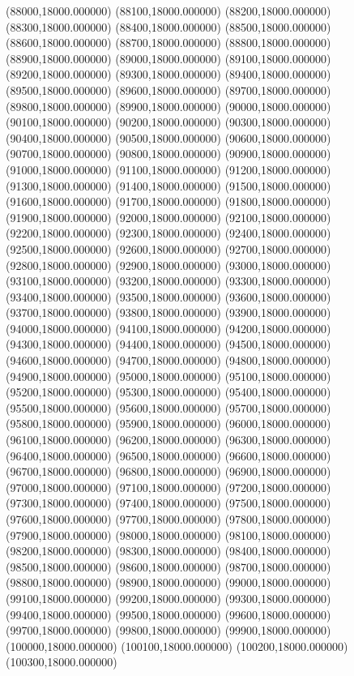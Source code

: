 (88000,18000.000000)
(88100,18000.000000)
(88200,18000.000000)
(88300,18000.000000)
(88400,18000.000000)
(88500,18000.000000)
(88600,18000.000000)
(88700,18000.000000)
(88800,18000.000000)
(88900,18000.000000)
(89000,18000.000000)
(89100,18000.000000)
(89200,18000.000000)
(89300,18000.000000)
(89400,18000.000000)
(89500,18000.000000)
(89600,18000.000000)
(89700,18000.000000)
(89800,18000.000000)
(89900,18000.000000)
(90000,18000.000000)
(90100,18000.000000)
(90200,18000.000000)
(90300,18000.000000)
(90400,18000.000000)
(90500,18000.000000)
(90600,18000.000000)
(90700,18000.000000)
(90800,18000.000000)
(90900,18000.000000)
(91000,18000.000000)
(91100,18000.000000)
(91200,18000.000000)
(91300,18000.000000)
(91400,18000.000000)
(91500,18000.000000)
(91600,18000.000000)
(91700,18000.000000)
(91800,18000.000000)
(91900,18000.000000)
(92000,18000.000000)
(92100,18000.000000)
(92200,18000.000000)
(92300,18000.000000)
(92400,18000.000000)
(92500,18000.000000)
(92600,18000.000000)
(92700,18000.000000)
(92800,18000.000000)
(92900,18000.000000)
(93000,18000.000000)
(93100,18000.000000)
(93200,18000.000000)
(93300,18000.000000)
(93400,18000.000000)
(93500,18000.000000)
(93600,18000.000000)
(93700,18000.000000)
(93800,18000.000000)
(93900,18000.000000)
(94000,18000.000000)
(94100,18000.000000)
(94200,18000.000000)
(94300,18000.000000)
(94400,18000.000000)
(94500,18000.000000)
(94600,18000.000000)
(94700,18000.000000)
(94800,18000.000000)
(94900,18000.000000)
(95000,18000.000000)
(95100,18000.000000)
(95200,18000.000000)
(95300,18000.000000)
(95400,18000.000000)
(95500,18000.000000)
(95600,18000.000000)
(95700,18000.000000)
(95800,18000.000000)
(95900,18000.000000)
(96000,18000.000000)
(96100,18000.000000)
(96200,18000.000000)
(96300,18000.000000)
(96400,18000.000000)
(96500,18000.000000)
(96600,18000.000000)
(96700,18000.000000)
(96800,18000.000000)
(96900,18000.000000)
(97000,18000.000000)
(97100,18000.000000)
(97200,18000.000000)
(97300,18000.000000)
(97400,18000.000000)
(97500,18000.000000)
(97600,18000.000000)
(97700,18000.000000)
(97800,18000.000000)
(97900,18000.000000)
(98000,18000.000000)
(98100,18000.000000)
(98200,18000.000000)
(98300,18000.000000)
(98400,18000.000000)
(98500,18000.000000)
(98600,18000.000000)
(98700,18000.000000)
(98800,18000.000000)
(98900,18000.000000)
(99000,18000.000000)
(99100,18000.000000)
(99200,18000.000000)
(99300,18000.000000)
(99400,18000.000000)
(99500,18000.000000)
(99600,18000.000000)
(99700,18000.000000)
(99800,18000.000000)
(99900,18000.000000)
(100000,18000.000000)
(100100,18000.000000)
(100200,18000.000000)
(100300,18000.000000)
